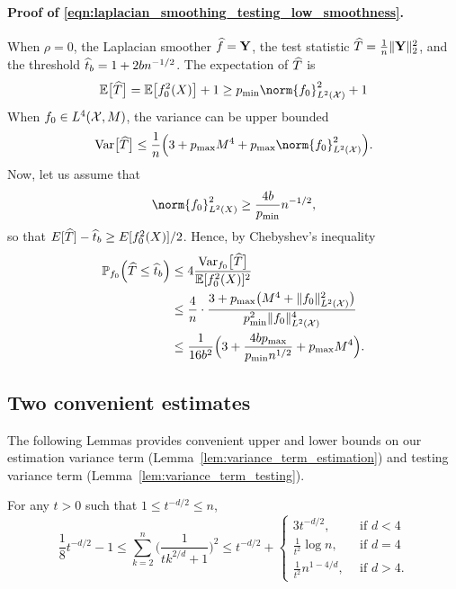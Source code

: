 \paragraph{Proof of \eqref{eqn:laplacian_smoothing_testing_low_smoothness}.}
When $\rho = 0$, the Laplacian smoother $\widehat{f} = \mathbf{Y}$, the test statistic $\widehat{T} = \frac{1}{n}\|\mathbf{Y}\|_2^2$, and the threshold $\widehat{t}_b = 1 + 2bn^{-1/2}$. The expectation of $\widehat{T}$ is 
\begin{equation*}
\Ebb\bigl[\wh{T}\bigr] = \mathbb{E}\bigl[f_0^2(X)\bigr] + 1 \geq p_{\min} \norm{f_0}_{\Leb^2(\Xset)}^2 + 1
\end{equation*}
When $f_0 \in L^4(\mathcal{X},M)$, the variance can be upper bounded
\begin{equation*}
\Var\bigl[\wh{T}\bigr] \leq \frac{1}{n}\Bigl(3 + p_{\max} M^4 + p_{\max}\norm{f_0}_{\Leb^2(\Xset)}^2\Bigr).
\end{equation*}
Now, let us assume that
\begin{equation*}
\norm{f_0}_{\Leb^2(X)}^2 \geq \frac{4b}{p_{\min}} n^{-1/2},
\end{equation*}
so that $E[\widehat{T}] - \widehat{t}_b \geq E[f_0^2(X)]/2$. Hence, by Chebyshev's inequality
\begin{align*}
\mathbb{P}_{f_0}\Bigl(\widehat{T} \leq \widehat{t}_b \Bigr) & \leq 4 \frac{\mathrm{Var}_{f_0}\bigl[\widehat{T}\bigr]}{\mathbb{E}[f_0^2(X)]^2} \\
& \leq \frac{4}{n} \cdot \frac{ 3 + p_{\max}\bigl(M^4 + \|f_0\|_{L^2(\mathcal{X})}^2 \bigr)}{p_{\min}^2 \|f_0\|_{L^2(\mathcal{X})}^4} \\
& \leq \frac{1}{16b^2}\Bigl(3 + \frac{4bp_{\max}}{p_{\min}n^{1/2}} + p_{\max}M^4\Bigr).
\end{align*}

\subsection{Two convenient estimates}
\label{subsec:convenient_estimate}

The following Lemmas provides convenient upper and lower bounds on our estimation variance term (Lemma~\ref{lem:variance_term_estimation}) and testing variance term (Lemma~\ref{lem:variance_term_testing}).
\begin{lemma}
	\label{lem:variance_term_estimation}
	For any $t > 0$ such that $1 \leq t^{-d/2} \leq n$,
	\begin{equation*}
	\frac{1}{8}t^{-d/2} - 1 \leq \sum_{k = 2}^{n} \biggl(\frac{1}{tk^{2/d} + 1}\biggr)^2 \leq t^{-d/2} +
	\begin{cases*}
	3t^{-d/2},& ~~\textrm{if $d < 4$} \\
	\frac{1}{t^2}\log n,& ~~\textrm{if $d = 4$} \\
	\frac{1}{t^2}n^{1 - 4/d},&~~\textrm{if $d > 4$.}
	\end{cases*}
	\end{equation*}
\end{lemma}

